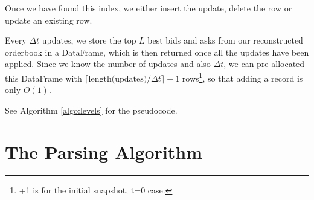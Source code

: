 \documentclass[a4paper, oneside, notitlepage]{book}
\begin{document}
Once we have found this index, we either insert the update, delete the row or
update an existing row.

Every $\Delta t$ updates, we store the top $L$ best bids and asks from our reconstructed
orderbook in a DataFrame, which is then returned once all the updates
have been applied. Since we know the number of updates and also $\Delta t$, we can
pre-allocated this DataFrame with $\lceil \text{length(updates)} / \Delta t \rceil + 1$ rows\footnote{+1 is for the initial snapshot, t=0 case.}, so that
adding a record is only $O(1)$. 

See Algorithm \ref{algo:levels} for the pseudocode.

\section{The Parsing Algorithm}
\end{document}
